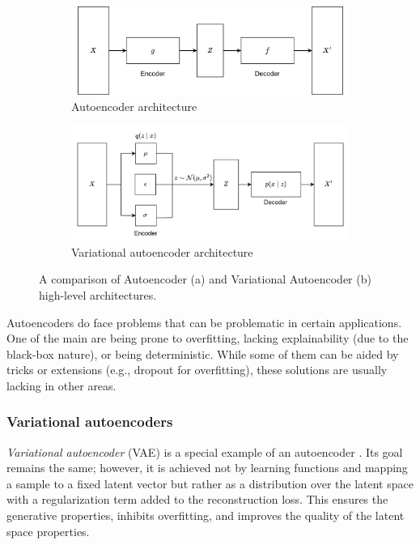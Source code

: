 \begin{figure}[h]
     \centering
     \begin{subfigure}[b]{0.9\textwidth}
         \centering
         \includegraphics[width=\textwidth]{methods/img/AE_architecture.drawio.png}
         \caption{Autoencoder architecture} \label{fig:vae-ae-architecture}
     \end{subfigure} 
     \begin{subfigure}[b]{0.9\textwidth}
          \includegraphics[width=\textwidth]{methods/img/VAE_architecture.drawio.png}
         \caption{Variational autoencoder architecture} \label{fig:vae-architecture}
     \end{subfigure} 
     \caption[Comparison of AE and VAE high-level architectures]{A comparison of Autoencoder (a) and Variational Autoencoder (b) high-level architectures.}
    \label{fig:vae-ae-architectures}
\end{figure}

\vspace{\baselineskip}
Autoencoders do face problems that can be problematic in certain applications. One of the main are being prone to overfitting, lacking explainability (due to the black-box nature), or being deterministic. While some of them can be aided by tricks or extensions (e.g., dropout for overfitting), these solutions are usually lacking in other areas.

\subsubsection{Variational autoencoders}
\textit{Variational autoencoder} (VAE) is a special example of an autoencoder \cite{Kingma2013}. Its goal remains the same; however, it is achieved not by learning functions and mapping a sample to a fixed latent vector but rather as a distribution over the latent space with a regularization term added to the reconstruction loss. This ensures the generative properties, inhibits overfitting, and improves the quality of the latent space properties.

